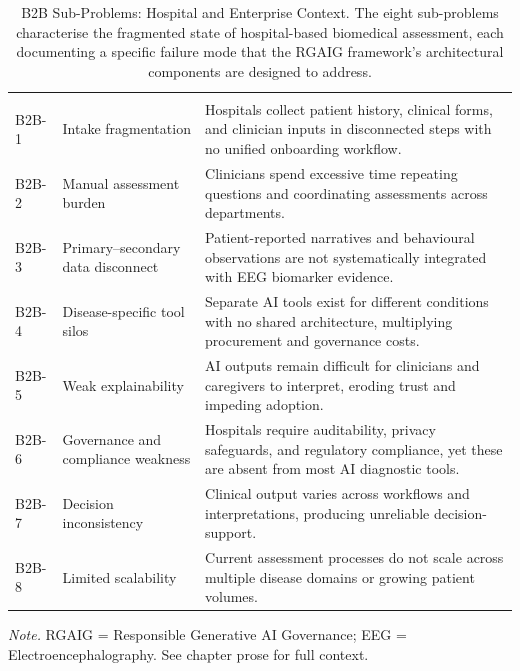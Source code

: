 {\tablestripes\tablefontsize
\begin{xltabular}{\textwidth}{@{} >{\raggedright\arraybackslash}p{1.1cm} >{\raggedright\arraybackslash}p{4.0cm} L @{}}
\caption[B2B Sub-Problems: Hospital and Enterprise Context]{B2B Sub-Problems: Hospital and Enterprise Context. The eight sub-problems characterise the fragmented state of hospital-based biomedical assessment, each documenting a specific failure mode that the RGAIG framework's architectural components are designed to address.}\label{tab:b2b_subproblems} \\
\toprule
\thead{\#} &  &  \\
\midrule
\endfirsthead
\toprule
\thead{\#} &  &  \\
\midrule
\endhead
\bottomrule
\endlastfoot
B2B-1 & Intake fragmentation & Hospitals collect patient history, clinical forms, and clinician inputs in disconnected steps with no unified onboarding workflow. \\
\addlinespace
B2B-2 & Manual assessment burden & Clinicians spend excessive time repeating questions and coordinating assessments across departments. \\
\addlinespace
B2B-3 & Primary--secondary data disconnect & Patient-reported narratives and behavioural observations are not systematically integrated with EEG biomarker evidence. \\
\addlinespace
B2B-4 & Disease-specific tool silos & Separate AI tools exist for different conditions with no shared architecture, multiplying procurement and governance costs. \\
\addlinespace
B2B-5 & Weak explainability & AI outputs remain difficult for clinicians and caregivers to interpret, eroding trust and impeding adoption. \\
\addlinespace
B2B-6 & Governance and compliance weakness & Hospitals require auditability, privacy safeguards, and regulatory compliance, yet these are absent from most AI diagnostic tools. \\
\addlinespace
B2B-7 & Decision inconsistency & Clinical output varies across workflows and interpretations, producing unreliable decision-support. \\
\addlinespace
B2B-8 & Limited scalability & Current assessment processes do not scale across multiple disease domains or growing patient volumes. \\
\end{xltabular}}
\vspace{0.3em}\noindent\textit{Note.} RGAIG = Responsible Generative AI Governance; EEG = Electroencephalography. See chapter prose for full context.

